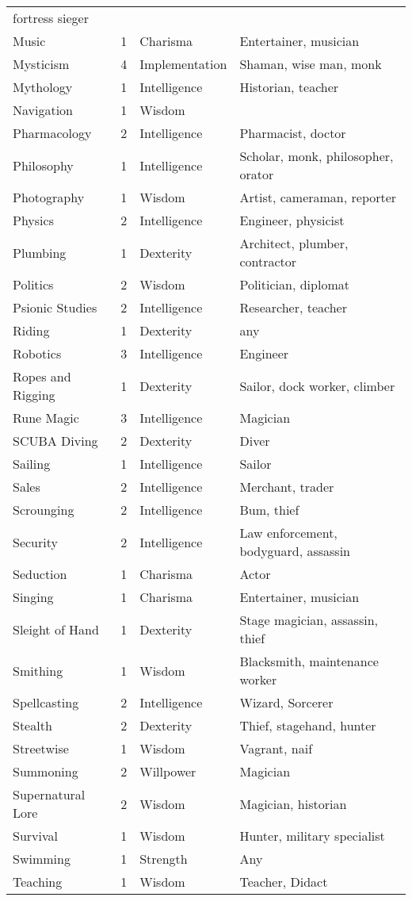 \documentclass[twoside]{book}
\begin{document}
\begin{longtable}{p{1.25in}llp{12em}}
           fortress sieger\tabularnewline
      \raggedright  Music& 1& Charisma& Entertainer, musician\tabularnewline
      \raggedright  Mysticism& 4& Implementation& Shaman, wise man, monk\tabularnewline
      \raggedright  Mythology& 1& Intelligence& Historian, teacher\tabularnewline
      \raggedright  Navigation& 1& Wisdom\tabularnewline
      \raggedright  Pharmacology& 2& Intelligence& Pharmacist, doctor\tabularnewline
      \raggedright  Philosophy& 1& Intelligence& Scholar, monk,
           philosopher, orator\tabularnewline
      \raggedright  Photography& 1& Wisdom& Artist, cameraman,
           reporter\tabularnewline
      \raggedright  Physics& 2& Intelligence& Engineer, physicist\tabularnewline
      \raggedright  Plumbing& 1& Dexterity& Architect, plumber,
           contractor\tabularnewline
      \raggedright  Politics& 2& Wisdom& Politician, diplomat\tabularnewline
      \raggedright  Psionic Studies& 2& Intelligence& Researcher, teacher\tabularnewline
      \raggedright  Riding& 1& Dexterity& any\tabularnewline
      \raggedright  Robotics& 3& Intelligence& Engineer\tabularnewline
      \raggedright  Ropes and Rigging& 1& Dexterity& Sailor, dock worker,
           climber\tabularnewline
      \raggedright  Rune Magic& 3& Intelligence& Magician\tabularnewline
      \raggedright  SCUBA Diving& 2& Dexterity& Diver\tabularnewline
      \raggedright  Sailing& 1& Intelligence& Sailor\tabularnewline
      \raggedright  Sales& 2& Intelligence& Merchant, trader\tabularnewline
      \raggedright  Scrounging& 2& Intelligence& Bum, thief\tabularnewline
      \raggedright  Security& 2& Intelligence& Law enforcement,
           bodyguard, assassin\tabularnewline
      \raggedright  Seduction& 1& Charisma& Actor\tabularnewline
      \raggedright  Singing& 1& Charisma& Entertainer, musician\tabularnewline
      \raggedright  Sleight of Hand& 1& Dexterity& Stage magician, assassin,
           thief\tabularnewline
      \raggedright  Smithing& 1& Wisdom& Blacksmith, maintenance
           worker\tabularnewline
      \raggedright  Spellcasting& 2& Intelligence& Wizard, Sorcerer\tabularnewline
      \raggedright  Stealth& 2& Dexterity& Thief, stagehand, hunter\tabularnewline
      \raggedright  Streetwise& 1& Wisdom& Vagrant, naif\tabularnewline
      \raggedright  Summoning& 2& Willpower& Magician\tabularnewline
      \raggedright  Supernatural Lore& 2& Wisdom& Magician, historian\tabularnewline
      \raggedright  Survival& 1& Wisdom& Hunter, military
           specialist\tabularnewline
      \raggedright  Swimming& 1& Strength& Any\tabularnewline
      \raggedright  Teaching& 1& Wisdom& Teacher, Didact\tabularnewline

\end{longtable}
\end{document}
